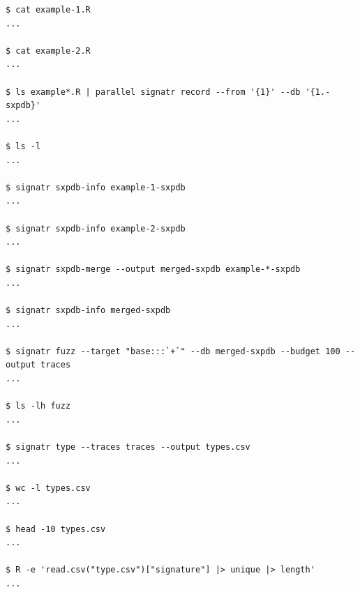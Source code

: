 \documentclass[sigplan,anonymous,review]{acmart}
\begin{document}
\begin{lstlisting}
$ cat example-1.R
...

$ cat example-2.R
...

$ ls example*.R | parallel signatr record --from '{1}' --db '{1.-sxpdb}'
...

$ ls -l
...

$ signatr sxpdb-info example-1-sxpdb
...

$ signatr sxpdb-info example-2-sxpdb
...

$ signatr sxpdb-merge --output merged-sxpdb example-*-sxpdb
...

$ signatr sxpdb-info merged-sxpdb
...

$ signatr fuzz --target "base:::`+`" --db merged-sxpdb --budget 100 --output traces
...

$ ls -lh fuzz
...

$ signatr type --traces traces --output types.csv
...

$ wc -l types.csv
...

$ head -10 types.csv
...

$ R -e 'read.csv("type.csv")["signature"] |> unique |> length'
...

\end{lstlisting}
\end{document}

